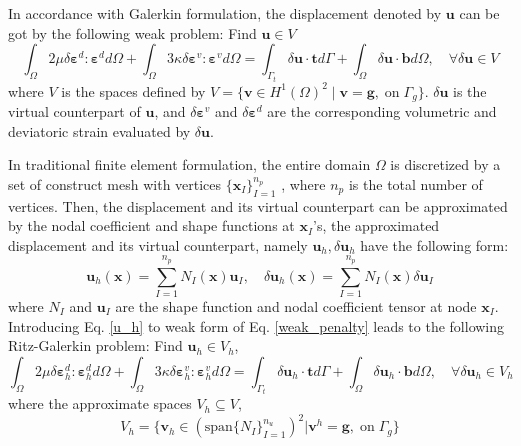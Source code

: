 In accordance with Galerkin formulation, the displacement denoted by $\boldsymbol u$ can be got by the following weak problem: 
Find $\boldsymbol u \in V$
\begin{equation}\label{weak_penalty}
\int_\Omega 2\mu \delta \boldsymbol \varepsilon^d : \boldsymbol \varepsilon^d d\Omega +
\int_\Omega 3\kappa \delta \boldsymbol \varepsilon^v : \boldsymbol \varepsilon^v d\Omega =
\int_{\Gamma_t} \delta \boldsymbol u \cdot \boldsymbol t d\Gamma + \int_\Omega \delta \boldsymbol u \cdot \boldsymbol b d\Omega,  \quad
\forall \delta \boldsymbol u \in V
\end{equation}
where $V$ is the spaces defined by $V=\{\boldsymbol v \in H^1(\Omega)^2\;\vert\;\boldsymbol v = \boldsymbol g, \; \textrm{on} \; \Gamma_g\}$. $\delta \boldsymbol u$ is the virtual counterpart of $\boldsymbol u$, and $\delta \boldsymbol \varepsilon^v$ and $\delta \boldsymbol \varepsilon^d$ are the corresponding volumetric and deviatoric strain evaluated by $\delta \boldsymbol u$.

In traditional finite element formulation, the entire domain $\Omega$ is discretized by a set of construct mesh with vertices $\{\boldsymbol x_I\}_{I=1}^{n_p}$ \cite{hughes2000}, where $n_p$ is the total number of vertices. Then, the displacement and its virtual counterpart can be approximated by the nodal coefficient and shape functions at $\boldsymbol x_I$'s, the approximated displacement and its virtual counterpart, namely $\boldsymbol u_h, \delta \boldsymbol u_h$ have the following form: 
\begin{equation}\label{u_h}
\boldsymbol u_h(\boldsymbol x) = \sum_{I=1}^{n_p} N_I(\boldsymbol x) \boldsymbol u_I, \quad
\delta \boldsymbol u_h(\boldsymbol x) = \sum_{I=1}^{n_p} N_I(\boldsymbol x) \delta \boldsymbol u_I
\end{equation}
where $N_I$ and $\boldsymbol u_I$ are the shape function and nodal coefficient tensor at node $\boldsymbol x_I$.
Introducing Eq. \eqref{u_h} to weak form of Eq. \eqref{weak_penalty} leads to the following Ritz-Galerkin problem:
Find $\boldsymbol u_h \in V_h$,
\begin{equation}\label{ritz_penalty}
\int_\Omega 2\mu \delta \boldsymbol \varepsilon^d_h : \boldsymbol \varepsilon^d_h d\Omega +
\int_\Omega 3\kappa \delta \boldsymbol \varepsilon^v_h : \boldsymbol \varepsilon^v_h d\Omega =
\int_{\Gamma_t} \delta \boldsymbol u_h \cdot \boldsymbol t d\Gamma + \int_\Omega \delta \boldsymbol u_h \cdot \boldsymbol b d\Omega,  \quad
\forall \delta \boldsymbol u_h \in V_h
\end{equation}
where the approximate spaces $V_h \subseteq V$,
\begin{equation}
V_h = \{\boldsymbol v_h \in (\mathrm{span}\{N_I\}_{I=1}^{n_u})^2 \vert \boldsymbol v^h = \boldsymbol g,\; \mathrm{on} \; \Gamma_g\}
\end{equation}

